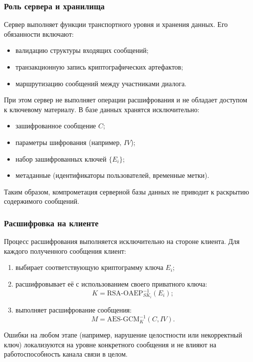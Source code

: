 \documentclass{article}
\begin{document}
\subsubsection{Роль сервера и хранилища}

Сервер выполняет функции транспортного уровня и хранения данных. Его обязанности включают:
\begin{itemize}
\item валидацию структуры входящих сообщений;
\item транзакционную запись криптографических артефактов;
\item маршрутизацию сообщений между участниками диалога.
\end{itemize}

При этом сервер не выполняет операции расшифрования и не обладает доступом к ключевому материалу. В базе данных хранятся исключительно:
\begin{itemize}
\item зашифрованное сообщение $C$;
\item параметры шифрования (например, $IV$);
\item набор зашифрованных ключей $\{E_i\}$;
\item метаданные (идентификаторы пользователей, временные метки).
\end{itemize}

Таким образом, компрометация серверной базы данных не приводит к раскрытию содержимого сообщений.

\subsubsection{Расшифровка на клиенте}

Процесс расшифрования выполняется исключительно на стороне клиента. Для каждого полученного сообщения клиент:

\begin{enumerate}
\item выбирает соответствующую криптограмму ключа $E_i$;
\item расшифровывает её с использованием своего приватного ключа:
\[
K = \text{RSA-OAEP}^{-1}_{SK_i}(E_i);
\]
\item выполняет расшифрование сообщения:
\[
M = \text{AES-GCM}^{-1}_K(C, IV).
\]
\end{enumerate}

Ошибки на любом этапе (например, нарушение целостности или некорректный ключ) локализуются на уровне конкретного сообщения и не влияют на работоспособность канала связи в целом.
\end{document}

